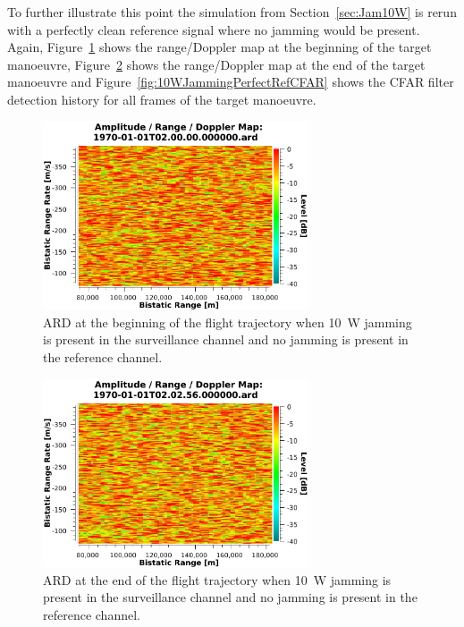 \documentclass[english, 12pt]{report}
\begin{document}
To further illustrate this point the simulation from Section~\ref{sec:Jam10W} is rerun with a perfectly clean reference signal where no jamming would be present. Again, Figure~\ref{fig:10WJammingPerfectRefARDFirst} shows the range/Doppler map at the beginning of the target manoeuvre, Figure~\ref{fig:10WJammingPerfectRefARDLast} shows the range/Doppler map at the end of the target manoeuvre and Figure~\ref{fig:10WJammingPerfectRefCFAR} shows the CFAR filter detection history for all frames of the target manoeuvre.

\begin{figure}[htbp]
\begin{center}
\includegraphics[width=0.7\textwidth]{figs/Simulations/10WJammingPerfectRefARDFirst.pdf}
\caption[ARD at the beginning of track 10~W jammer.]{ARD at the beginning of the flight trajectory when 10~W jamming is present in the surveillance channel and no jamming is present in the reference channel.}
\label{fig:10WJammingPerfectRefARDFirst}
\end{center}
\end{figure}

\begin{figure}[htbp]
\begin{center}
\includegraphics[width=0.7\textwidth]{figs/Simulations/10WJammingPerfectRefARDLast.pdf}
\caption[ARD end of trajectory 10~W jammer.]{ARD at the end of the flight trajectory when 10~W jamming is present in the surveillance channel and no jamming is present in the reference channel.}
\label{fig:10WJammingPerfectRefARDLast}
\end{center}
\end{figure}
\end{document}
